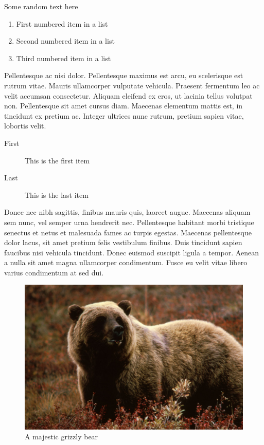 \documentclass[10pt, a4paper, twocolumn]{article} %
\begin{document}
Some random text here\\

\begin{enumerate}
	\item First numbered item in a list
	\item Second numbered item in a list
	\item Third numbered item in a list
\end{enumerate}

Pellentesque ac nisi dolor. Pellentesque maximus est arcu, eu scelerisque est rutrum vitae. Mauris ullamcorper vulputate vehicula. Praesent fermentum leo ac velit accumsan consectetur. Aliquam eleifend ex eros, ut lacinia tellus volutpat non. Pellentesque sit amet cursus diam. Maecenas elementum mattis est, in tincidunt ex pretium ac. Integer ultrices nunc rutrum, pretium sapien vitae, lobortis velit.

\begin{description}
	\item[First] This is the first item
	\item[Last] This is the last item
\end{description}

Donec nec nibh sagittis, finibus mauris quis, laoreet augue. Maecenas aliquam sem nunc, vel semper urna hendrerit nec. Pellentesque habitant morbi tristique senectus et netus et malesuada fames ac turpis egestas. Maecenas pellentesque dolor lacus, sit amet pretium felis vestibulum finibus. Duis tincidunt sapien faucibus nisi vehicula tincidunt. Donec euismod suscipit ligula a tempor. Aenean a nulla sit amet magna ullamcorper condimentum. Fusce eu velit vitae libero varius condimentum at sed dui.

\begin{figure}
	\includegraphics[width=\linewidth]{bear.jpg} %
	\caption{A majestic grizzly bear} %
	\label{bear} %
\end{figure}
\end{document}
